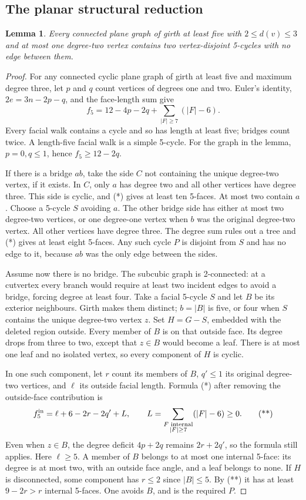 \documentclass[11pt]{article}
\newtheorem{lemma}[theorem]{Lemma}
\theoremstyle{remark}
\numberwithin{equation}{section}
\begin{document}
\subsection{The planar structural reduction}
\begin{lemma}\label{lem:two-separated-five-faces}
Every connected plane graph of girth at least five with
$2\le d(v)\le3$ and at most one degree-two vertex contains
two vertex-disjoint 5-cycles with no edge between them.
\end{lemma}
\begin{proof}
For any connected cyclic plane graph of girth at least five and
maximum degree three, let $p$ and $q$ count vertices of degrees one
and two. Euler's identity, $2e=3n-2p-q$, and the face-length sum give
\[
 f_5=12-4p-2q+\sum_{|F|\ge7}(|F|-6).                 \tag{*}
\]
Every facial walk contains a cycle and so has length at least five;
bridges count twice. A length-five facial walk is a simple 5-cycle.
For the graph in the lemma, $p=0,q\le1$, hence $f_5\ge12-2q$.

If there is a bridge $ab$, take the side $C$ not containing the
unique degree-two vertex, if it exists. In $C$, only $a$ has degree
two and all other vertices have degree three. This side is cyclic,
and (*) gives at least ten 5-faces. At most two contain $a$.
Choose a 5-cycle $S$ avoiding $a$. The other bridge side has either
at most two degree-two vertices, or one degree-one vertex when
$b$ was the original degree-two vertex. All other vertices have
degree three. The degree sum rules out a tree and (*) gives at
least eight 5-faces. Any such cycle $P$ is disjoint from $S$ and
has no edge to it, because $ab$ was the only edge between the sides.

Assume now there is no bridge. The subcubic graph is 2-connected:
at a cutvertex every branch would require at least two incident
edges to avoid a bridge, forcing degree at least four.
Take a facial 5-cycle $S$ and let $B$ be its exterior neighbours.
Girth makes them distinct; $b=|B|$ is five, or four when $S$
contains the unique degree-two vertex $z$.
Set $H=G-S$, embedded with the deleted region outside.
Every member of $B$ is on that outside face. Its degree drops
from three to two, except that $z\in B$ would become a leaf.
There is at most one leaf and no isolated vertex, so every component
of $H$ is cyclic.

In one such component, let $r$ count its members of $B$, $q'\le1$
its original degree-two vertices, and $\ell$ its outside facial
length. Formula (*) after removing the outside-face contribution is
\[
 f^{\rm in}_5=\ell+6-2r-2q'+L,\qquad
 L=\sum_{\substack{F\text{ internal}\\|F|\ge7}}(|F|-6)\ge0.       \tag{**}
\]
Even when $z\in B$, the degree deficit $4p+2q$ remains
$2r+2q'$, so the formula still applies. Here $\ell\ge5$.
A member of $B$ belongs to at most one internal 5-face: its degree
is at most two, with an outside face angle, and a leaf belongs to none.
If $H$ is disconnected, some component has $r\le2$ since
$|B|\le5$. By (**) it has at least $9-2r>r$ internal 5-faces.
One avoids $B$, and is the required $P$.


\end{proof}
\end{document}
